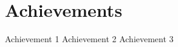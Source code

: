 \section{Achievements} %
\vspace{0.2mm}
\resumeItemListStart
\point Achievement 1
\point Achievement 2
\point Achievement 3
\resumeItemListEnd